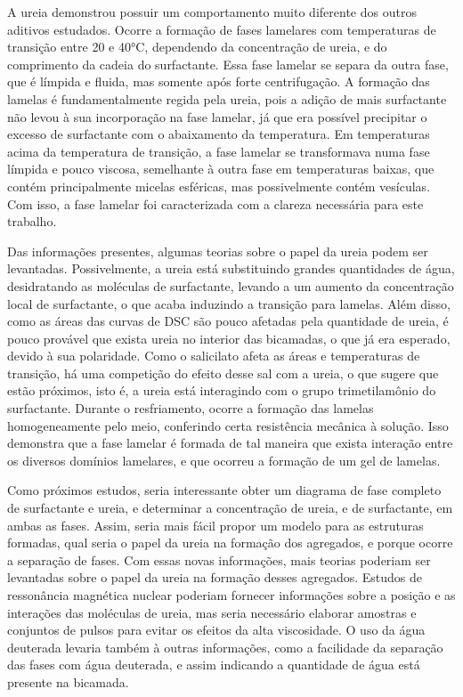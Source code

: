 	A ureia demonstrou possuir um comportamento muito diferente dos outros aditivos estudados. Ocorre a formação de fases lamelares com temperaturas de transição entre 20 e 40°C, dependendo da concentração de ureia, e do comprimento da cadeia do surfactante. Essa fase lamelar se separa da outra fase, que é límpida e fluida, mas somente após forte centrifugação. A formação das lamelas é fundamentalmente regida pela ureia, pois a adição de mais surfactante não levou à sua incorporação na fase lamelar, já que era possível precipitar o excesso de surfactante com o abaixamento da temperatura. Em temperaturas acima da temperatura de transição, a fase lamelar se transformava numa fase límpida e pouco viscosa, semelhante à outra fase em temperaturas baixas, que contém principalmente micelas esféricas, mas possivelmente contém vesículas. Com isso, a fase lamelar foi caracterizada com a clareza necessária para este trabalho.
	
	Das informações presentes, algumas teorias sobre o papel da ureia podem ser levantadas. Possivelmente, a ureia está substituindo grandes quantidades de água, desidratando as moléculas de surfactante, levando a um aumento da concentração local de surfactante, o que acaba induzindo a transição para lamelas. Além disso, como as áreas das curvas de DSC são pouco afetadas pela quantidade de ureia, é pouco provável que exista ureia no interior das bicamadas, o que já era esperado, devido à sua polaridade. Como o salicilato afeta as áreas e temperaturas de transição, há uma competição do efeito desse sal com a ureia, o que sugere que estão próximos, isto é, a ureia está interagindo com o grupo trimetilamônio do surfactante. Durante o resfriamento, ocorre a formação das lamelas homogeneamente pelo meio, conferindo certa resistência mecânica à solução. Isso demonstra que a fase lamelar é formada de tal maneira que exista interação entre os diversos domínios lamelares, e que ocorreu a formação de um gel de lamelas. 
	
	Como próximos estudos, seria interessante obter um diagrama de fase completo de surfactante e ureia, e determinar a concentração de ureia, e de surfactante, em ambas as fases. Assim, seria mais fácil propor um modelo para as estruturas formadas, qual seria o papel da ureia na formação dos agregados, e porque ocorre a separação de fases. Com essas novas informações, mais teorias poderiam ser levantadas sobre o papel da ureia na formação desses agregados. Estudos de ressonância magnética nuclear poderiam fornecer informações sobre a posição e as interações das moléculas de ureia, mas seria necessário elaborar amostras e conjuntos de pulsos para evitar os efeitos da alta viscosidade. O uso da água deuterada levaria também à outras informações, como a facilidade da separação das fases com água deuterada, e assim indicando a quantidade de água está presente na bicamada.